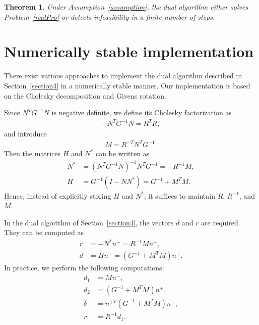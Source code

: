 \documentclass{article}
\newtheorem{theorem}{Theorem}
\begin{document}
	\begin{theorem}
		Under Assumption~\ref{assumption}, the dual algorithm either solves Problem~\eqref{realPro} or detects infeasibility in a finite number of steps.
	\end{theorem}
	
	\section{Numerically stable implementation}\label{section5}
	
	There exist various approaches to implement the dual algorithm described in Section~\ref{section4} in a numerically stable manner. 
	Our implementation is based on the Cholesky decomposition and Givens rotation.
	
	Since $N^{T}G^{-1}N$ is negative definite, we define its Cholesky factorization as
	\begin{align}
		-N^{T}G^{-1}N = R^{T}R,
	\end{align}
	and introduce
	\begin{align}
		M = R^{-T}N^{T}G^{-1}.
	\end{align}
	Then the matrices $H$ and $N^{\ast}$ can be written as
	\begin{align}
		N^{\ast} &= (N^{T}G^{-1}N)^{-1}N^{T}G^{-1} = -R^{-1}M,\\
		H &= G^{-1}(I - NN^{\ast}) = G^{-1} + M^{T}M.
	\end{align}
	Hence, instead of explicitly storing $H$ and $N^{\ast}$, it suffices to maintain $R$, $R^{-1}$, and $M$.
	
	In the dual algorithm of Section~\ref{section4}, the vectors $d$ and $r$ are required. They can be computed as
	\begin{align*}
		r &= -N^{\ast}n^{+} = R^{-1}Mn^{+},\\
		d &= Hn^{+} = (G^{-1} + M^{T}M)n^{+}.
	\end{align*}
	In practice, we perform the following computations:
	\begin{align*}
		d_{1} &= Mn^{+},\\
		d_{2} &= (G^{-1} + M^{T}M)n^{+},\\
		\delta &= n^{+T}(G^{-1} + M^{T}M)n^{+},\\
		r &= R^{-1}d_{1}.
	\end{align*}
	
\end{document}
